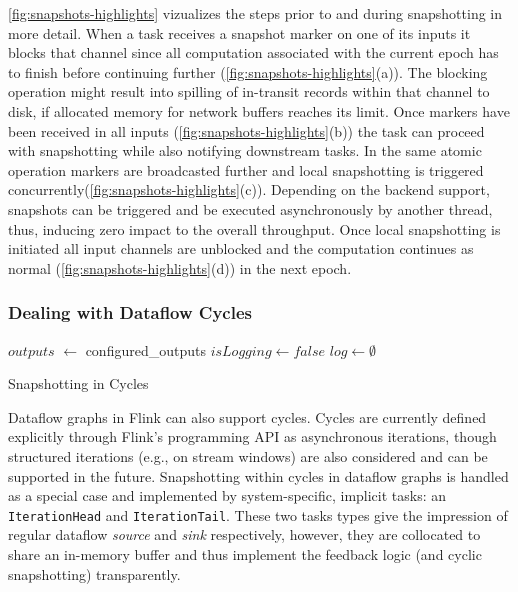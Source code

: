  \autoref{fig:snapshots-highlights} vizualizes the steps prior to and during snapshotting in more detail. When a task receives a snapshot marker on one of its inputs it blocks that channel since all computation associated with the current epoch has to finish before continuing further (\autoref{fig:snapshots-highlights}(a)). The blocking operation might result into spilling of in-transit records within that channel to disk, if allocated memory for network buffers reaches its limit. Once markers have been received in all inputs (\autoref{fig:snapshots-highlights}(b)) the task can proceed with snapshotting while also notifying downstream tasks. In the same atomic operation markers are broadcasted further and local snapshotting is triggered concurrently(\autoref{fig:snapshots-highlights}(c)). Depending on the backend support, snapshots can be triggered and be executed asynchronously by another thread, thus, inducing zero impact to the overall throughput. Once local snapshotting is initiated all input channels are unblocked and the computation continues as normal (\autoref{fig:snapshots-highlights}(d)) in the next epoch.

\subsubsection{Dealing with Dataflow Cycles}

\begin{algorithm}
$outputs$ $\leftarrow$ configured\_outputs\;
$isLogging \leftarrow false$ \;
$log \leftarrow \emptyset$ \;

\caption{Snapshotting in Cycles}
\label{alg:snapcycle}
\end{algorithm}


Dataflow graphs in Flink can also support cycles. Cycles are currently defined explicitly through Flink's programming API as asynchronous iterations, though structured iterations (e.g., on stream windows) are also considered and can be supported in the future. Snapshotting within cycles in dataflow graphs is handled as a special case and implemented by system-specific, implicit tasks: an \texttt{IterationHead} and \texttt{IterationTail}. These two tasks types give the impression of regular dataflow \emph{source} and \emph{sink} respectively, however, they are collocated to share an in-memory buffer and thus implement the feedback logic (and cyclic snapshotting) transparently.

